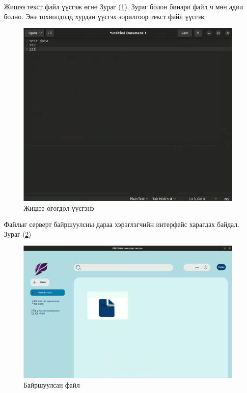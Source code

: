 Жишээ текст файл үүсгэж өгнө Зураг (\ref{fig:example_data}). Зураг болон бинари файл ч мөн адил болно. Энэ тохиолдолд хурдан үүсгэх зорилгоор текст файл үүсгэв.
\begin{figure}[H]
    \centering
    \includegraphics[scale=0.5]{Figures/example/example_data.png}
    \caption{Жишээ өгөгдөл үүсгэнэ}
    \label{fig:example_data}
\end{figure}

Файлыг серверт байршуулсны дараа хэрэглэгчийн интерфейс харагдах байдал. Зураг (\ref{fig:uploaded_file})
\begin{figure}[H]
    \centering
    \includegraphics[scale=0.32]{Figures/example/uploaded_file.png}
    \caption{Байршуулсан файл}
    \label{fig:uploaded_file}
\end{figure}

